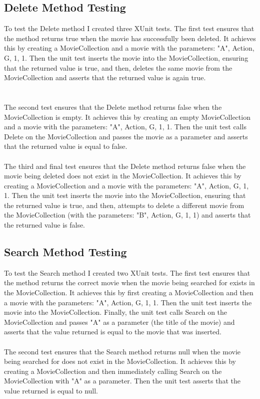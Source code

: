 \documentclass[12pt,a4paper]{article}
\begin{document}
		\subsection{Delete Method Testing}
			To test the Delete method I created three XUnit tests. The first test 
			ensures that the method returns true when the movie has successfully 
			been deleted. It achieves this by creating a MovieCollection and a 
			movie with the parameters: "A", Action, G, 1, 1. Then the unit test 
			inserts the movie into the MovieCollection, ensuring that the returned 
			value is true, and then, deletes the same movie from the MovieCollection 
			and asserts that the returned value is again true.\\
			\\
			\\
			The second test ensures that the Delete method returns false when the 
			MovieCollection is empty. It achieves this by creating an empty 
			MovieCollection and a movie with the parameters: "A", Action, G, 1, 1. 
			Then the unit test calls Delete on the MovieCollection and passes the 
			movie as a parameter and asserts that the returned value is equal to 
			false.\\
			\\
			The third and final test ensures that the Delete method returns false 
			when the movie being deleted does not exist in the MovieCollection. 
			It achieves this by creating a MovieCollection and a movie with the 
			parameters: "A", Action, G, 1, 1. Then the unit test inserts the movie 
			into the MovieCollection, ensuring that the returned value is true, 
			and then, attempts to delete a different movie from the MovieCollection 
			(with the parameters: "B", Action, G, 1, 1) and asserts that the returned 
			value is false.\\

		\subsection{Search Method Testing}
			To test the Search method I created two XUnit tests. The first test 
			ensures that the method returns the correct movie when the movie being 
			searched for exists in the MovieCollection. It achieves this by first 
			creating a MovieCollection and then a movie with the parameters: "A", 
			Action, G, 1, 1. Then the unit test inserts the movie into the 
			MovieCollection. Finally, the unit test calls Search on the 
			MovieCollection and passes "A" as a parameter (the title of the movie) 
			and asserts that the value returned is equal to the movie that was 
			inserted.\\
			\\
			The second test ensures that the Search method returns null when the 
			movie being searched for does not exist in the MovieCollection. It 
			achieves this by creating a MovieCollection and then immediately 
			calling Search on the MovieCollection with "A" as a parameter. Then 
			the unit test asserts that the value returned is equal to null.\\
\end{document}
